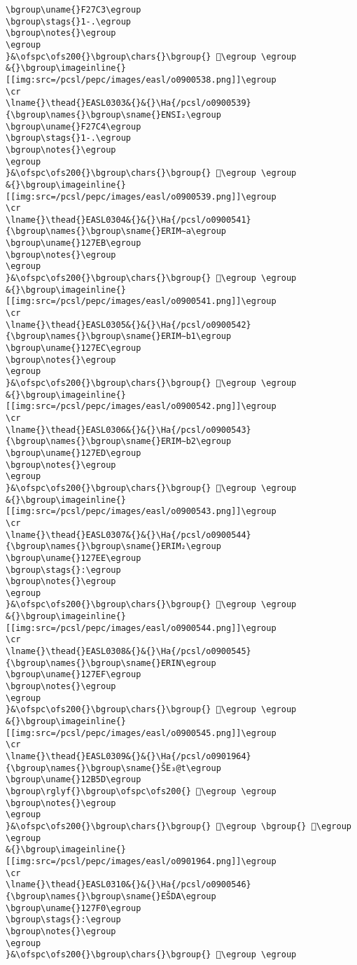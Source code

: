 \begin{verbatim}
\bgroup\uname{}F27C3\egroup
\bgroup\stags{}1-.\egroup
\bgroup\notes{}\egroup
\egroup
}&\ofspc\ofs200{}\bgroup\chars{}\bgroup{} 󲟃\egroup \egroup
&{}\bgroup\imageinline{}[[img:src=/pcsl/pepc/images/easl/o0900538.png]]\egroup
\cr
\lname{}\thead{}EASL0303&{}&{}\Ha{/pcsl/o0900539}{\bgroup\names{}\bgroup\sname{}ENSI₂\egroup
\bgroup\uname{}F27C4\egroup
\bgroup\stags{}1-.\egroup
\bgroup\notes{}\egroup
\egroup
}&\ofspc\ofs200{}\bgroup\chars{}\bgroup{} 󲟄\egroup \egroup
&{}\bgroup\imageinline{}[[img:src=/pcsl/pepc/images/easl/o0900539.png]]\egroup
\cr
\lname{}\thead{}EASL0304&{}&{}\Ha{/pcsl/o0900541}{\bgroup\names{}\bgroup\sname{}ERIM∼a\egroup
\bgroup\uname{}127EB\egroup
\bgroup\notes{}\egroup
\egroup
}&\ofspc\ofs200{}\bgroup\chars{}\bgroup{} 𒟫\egroup \egroup
&{}\bgroup\imageinline{}[[img:src=/pcsl/pepc/images/easl/o0900541.png]]\egroup
\cr
\lname{}\thead{}EASL0305&{}&{}\Ha{/pcsl/o0900542}{\bgroup\names{}\bgroup\sname{}ERIM∼b1\egroup
\bgroup\uname{}127EC\egroup
\bgroup\notes{}\egroup
\egroup
}&\ofspc\ofs200{}\bgroup\chars{}\bgroup{} 𒟬\egroup \egroup
&{}\bgroup\imageinline{}[[img:src=/pcsl/pepc/images/easl/o0900542.png]]\egroup
\cr
\lname{}\thead{}EASL0306&{}&{}\Ha{/pcsl/o0900543}{\bgroup\names{}\bgroup\sname{}ERIM∼b2\egroup
\bgroup\uname{}127ED\egroup
\bgroup\notes{}\egroup
\egroup
}&\ofspc\ofs200{}\bgroup\chars{}\bgroup{} 𒟭\egroup \egroup
&{}\bgroup\imageinline{}[[img:src=/pcsl/pepc/images/easl/o0900543.png]]\egroup
\cr
\lname{}\thead{}EASL0307&{}&{}\Ha{/pcsl/o0900544}{\bgroup\names{}\bgroup\sname{}ERIM₂\egroup
\bgroup\uname{}127EE\egroup
\bgroup\stags{}:\egroup
\bgroup\notes{}\egroup
\egroup
}&\ofspc\ofs200{}\bgroup\chars{}\bgroup{} 𒟮\egroup \egroup
&{}\bgroup\imageinline{}[[img:src=/pcsl/pepc/images/easl/o0900544.png]]\egroup
\cr
\lname{}\thead{}EASL0308&{}&{}\Ha{/pcsl/o0900545}{\bgroup\names{}\bgroup\sname{}ERIN\egroup
\bgroup\uname{}127EF\egroup
\bgroup\notes{}\egroup
\egroup
}&\ofspc\ofs200{}\bgroup\chars{}\bgroup{} 𒟯\egroup \egroup
&{}\bgroup\imageinline{}[[img:src=/pcsl/pepc/images/easl/o0900545.png]]\egroup
\cr
\lname{}\thead{}EASL0309&{}&{}\Ha{/pcsl/o0901964}{\bgroup\names{}\bgroup\sname{}ŠE₃@t\egroup
\bgroup\uname{}12B5D\egroup
\bgroup\rglyf{}\bgroup\ofspc\ofs200{} 𒭝\egroup \egroup
\bgroup\notes{}\egroup
\egroup
}&\ofspc\ofs200{}\bgroup\chars{}\bgroup{} 𒭛\egroup \bgroup{} 𒭝\egroup \egroup
&{}\bgroup\imageinline{}[[img:src=/pcsl/pepc/images/easl/o0901964.png]]\egroup
\cr
\lname{}\thead{}EASL0310&{}&{}\Ha{/pcsl/o0900546}{\bgroup\names{}\bgroup\sname{}EŠDA\egroup
\bgroup\uname{}127F0\egroup
\bgroup\stags{}:\egroup
\bgroup\notes{}\egroup
\egroup
}&\ofspc\ofs200{}\bgroup\chars{}\bgroup{} 𒟰\egroup \egroup

\end{verbatim}
